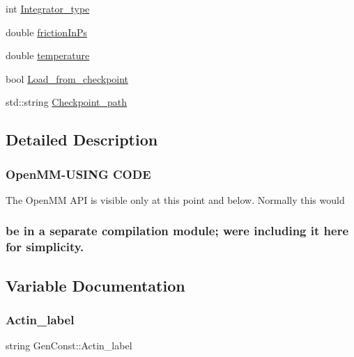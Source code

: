 \begin{DoxyCompactItemize}
int \mbox{\hyperlink{namespaceGenConst_aac105e3a7fd6172ca631f1272e4e8f04}{Integrator\+\_\+type}}
\item 
double \mbox{\hyperlink{namespaceGenConst_a3f1d6c5e542d1b61010d45677f8f3dfa}{friction\+In\+Ps}}
\item 
double \mbox{\hyperlink{namespaceGenConst_a28dbd03047e708d0c8b4d046ee539cd6}{temperature}}
\item 
bool \mbox{\hyperlink{namespaceGenConst_afa561c0190272a45bea9e3e7072cdfc7}{Load\+\_\+from\+\_\+checkpoint}}
\item 
std\+::string \mbox{\hyperlink{namespaceGenConst_ae5a6417b81e202f40623b5d72229f73a}{Checkpoint\+\_\+path}}
\end{DoxyCompactItemize}


\subsection{Detailed Description}


 \subsubsection*{Open\+M\+M-\/\+U\+S\+I\+NG C\+O\+DE }

The Open\+MM A\+PI is visible only at this point and below. Normally this would \subsubsection*{be in a separate compilation module; we\textquotesingle{}re including it here for simplicity. }

\subsection{Variable Documentation}
\mbox{\label{namespaceGenConst_a9acdda43f7e8ee196130df7f5966e658}} 
\subsubsection{\texorpdfstring{Actin\_label}{Actin\_label}}
{\footnotesize\ttfamily string Gen\+Const\+::\+Actin\+\_\+label}

\mbox{\label{namespaceGenConst_a605feaf5d31899243b6222624163cf29}} 
